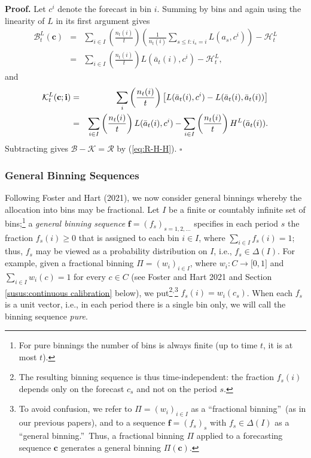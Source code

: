 \documentclass[12pt,a4paper,notitlepage]{article}
\newenvironment{proof}[1][Proof]{\noindent\textbf{#1.} }{\hfill $\square$}
\begin{document}
\begin{proof}
Let $c^{i}$ denote the forecast in bin $i$. Summing by bins and again using
the linearity of $L$ in its first argument gives 
\begin{eqnarray*}
\mathcal{B}_{t}^{L}(\mathbf{c}) &=&\sum_{i\in I}\left( \frac{n_{t}(i)}{t}%
\right) \left( \frac{1}{n_{t}(i)}\sum_{s\leq t:i_{s}=i}L(a_{s},c^{i})\right)
-\mathcal{H}_{t}^{L} \\
&=&\sum_{i\in I}\left( \frac{n_{t}(i)}{t}\right) L(\bar{a}_{t}(i),c^{i})-%
\mathcal{H}_{t}^{L},
\end{eqnarray*}%
and%
\begin{eqnarray*}
\mathcal{K}_{t}^{L}(\mathbf{c};\mathbf{i}) &=&\sum_{i}\left( \frac{n_{t}(i)}{%
t}\right) \left[ L(\bar{a}_{t}(i),c^{i})-L(\bar{a}_{t}(i),\bar{a}_{t}(i))%
\right] \\
&=&\sum_{i\in I}\left( \frac{n_{t}(i)}{t}\right) L(\bar{a}%
_{t}(i),c^{i})-\sum_{i\in I}\left( \frac{n_{t}(i)}{t}\right) H^{L}(\bar{a}%
_{t}(i)).
\end{eqnarray*}%
Subtracting gives $\mathcal{B}-\mathcal{K}=\mathcal{R}$ by (\ref{eq:R-H-H}).
\end{proof}

\subsubsection{General Binning Sequences\label{susus:fractional}}

Following Foster and Hart (2021), we now consider general binnings whereby
the allocation into bins may be fractional. Let $I$ be a finite or countably
infinite set of bins;\footnote{%
For pure binnings the number of bins is always finite (up to time $t$, it is
at most $t$).} a \emph{general binning sequence} $\mathbf{f}%
=(f_{s})_{s=1,2,\ldots }$ specifies in each period $s$ the fraction $%
f_{s}(i)\geq 0$ that is assigned to each bin $i\in I$, where $\sum_{i\in
I}f_{s}(i)=1$; thus, $f_{s}$ may be viewed as a probability distribution on $%
I$, i.e., $f_{s}\in \Delta (I)$. For example, given a fractional binning $%
\Pi =(w_{i})_{i\in I}$, where $w_{i}:C\rightarrow \lbrack 0,1]$ and $%
\sum_{i\in I}w_{i}(c)=1$ for every $c\in C$ (see Foster and Hart 2021 and
Section \ref{susus:continuous calibration} below), we put\footnote{%
The resulting binning sequence is thus time-independent: the fraction $%
f_{s}(i)$ depends only on the forecast $c_{s}$ and not on the period $s$.}$%
^{,}$\footnote{%
To avoid confusion, we refer to $\Pi =(w_{i})_{i\in I}$ as a
\textquotedblleft fractional binning\textquotedblright\ (as in our previous
papers), and to a sequence $\mathbf{f}=(f_{s})_{s}$ with $f_{s}\in \Delta (I)
$ as a \textquotedblleft general binning.\textquotedblright\ Thus, a
fractional binning $\Pi $ applied to a forecasting sequence $\mathbf{c}$
generates a general binning $\Pi (\mathbf{c})$.} $f_{s}(i)=w_{i}(c_{s})$.
When each $f_{s}$ is a unit vector, i.e., in each period there is a single
bin only, we will call the binning sequence \emph{pure}.
\end{document}
